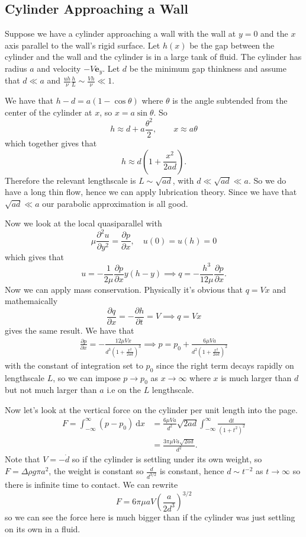 \documentclass{article}
\begin{document}
\subsection{Cylinder Approaching a Wall}
Suppose we have a cylinder approaching a wall with the wall at $ y=0 $ and the $ x $ axis parallel to the wall's rigid surface. Let $ h(x) $ be the gap between the cylinder and the wall and the cylinder is in a large tank of fluid. The cylinder has radius $ a $ and velocity $ -V\mathbf e_y $. Let $ d $ be the minimum gap thinkness and assume that $ d \ll a $ and $ \frac{uh}\nu \frac hL  \sim \frac{Vh}\nu \ll 1 $.\par
We have that $ h-d = a(1-\cos\theta) $ where $ \theta $ is the angle subtended from the center of the cylinder at $ x $, so $ x=a\sin\theta $. So 
\[
	h\approx d + a \frac{\theta^2}2,\qquad x\approx a\theta
\]
which together gives that
\[
	h \approx d\left(1 + \frac{x^2}{2ad}\right).
\]
Therefore the relevant lengthscale is $ L \sim \sqrt{ad} $, with $ d\ll \sqrt{ad} \ll a $. So we do have a long thin flow, hence we can apply lubrication theory. Since we have that $ \sqrt{ad}\ll a $ our parabolic approximation is all good.\par
Now we look at the local quasiparallel with
\[
\mu\frac{\partial^2 u}{\partial y^2} = \frac{\partial p}{\partial x}, \quad u(0) = u(h) = 0
\]
which gives that
\[
	u = - \frac 1{2\mu} \frac{\partial p}{\partial x} y(h-y)\implies q = -\frac{h^3}{12\mu} \frac{\partial p}{\partial x}.
\]
Now we can apply mass conservation. Physically it's obvious that $ q=Vx $ and mathemaically 
\[
	\frac{\partial q}{\partial x} = - \frac{\partial h}{\partial t} = V \implies q=  Vx
\]
gives the same result. We have that 
\begin{align*}
	\frac{\partial p}{\partial x} = - \frac{12 \mu Vx}{d^3\left(1+\frac{x^2}{2ad}\right)^3} \implies p = p_0 + \frac{6\mu Va}{d^2\left(1+\frac{x^2}{2ad}\right)^2}
\end{align*}
with the constant of integration set to $ p_0 $ since the right term decays rapidly on lengthscale $ L $, so we can impose $ p \to p_0 $ as $ x\to \infty $ where $ x $ is much larger than $ d $ but not much larger than $ a $ i.e on the $ L $ lengthscale.
\par
Now let's look at the vertical force on the cylinder per unit length into the page.
\begin{align*}
	F = \int_{-\infty}^\infty(p-p_0) \ \mathrm dx &= \frac{6\mu Va}{d^2} \sqrt{2ad}\int_{-\infty}^\infty\frac{\mathrm dt}{(1+t^2)^2} \\
						      &= \frac{3\pi\mu Va\sqrt{2ad}}{d^2}.
\end{align*}
Note that $ V = -\dot d $ so if the cylinder is settling under its own weight, so $ F= \Delta \rho g \pi a^2 $, the weight is constant so $ \frac{\dot d}{d^{3/2}} $ is constant, hence $ d \sim t^{-2} $ as $ t\to \infty $ so there is infinite time to contact. We can rewrite
\[
	F = 6\pi \mu a V \left(\frac{a}{2d^3}\right)^{3/2}
\]
so we can see the force here is much bigger than if the cylinder was just settling on its own in a fluid.
\end{document}
